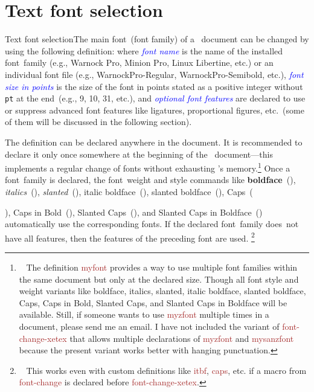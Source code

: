 {\section{Text font selection}{Text font selection}The main font~(font family) of a \capsxetex\ document can be changed by using the following definition:
\ms
\ii{}
\sk
\ii where \textcolor{blue}{\sl font name} is the name of the installed font~family (e.g., Warnock Pro, Minion Pro, Linux Libertine, etc.) or an individual font file (e.g., WarnockPro-Regular, WarnockPro-Semibold, etc.), \textcolor{blue}{\sl font size in points} is the size of the font in points stated as a positive integer without {\tt pt} at the end~(e.g., 9, 10, 31, etc.), and \textcolor{blue}{\sl optional font features} are declared to use or suppress advanced font features like ligatures, proportional figures, etc.~(some of them will be discussed in the following section).


The definition  can be declared anywhere in the document. It is recommended to declare it only once somewhere at the beginning of the \capstex\ document---this implements a regular change of fonts without exhausting \capstex's memory.\footnote{\ \; The definition \textcolor{brown}{\eighttt \bsl myfont} provides a way to use multiple font families within the same document but only at the declared size. Though all font style and weight variants like {\eightbf boldface}, {\eightit italics}, {\eightsl slanted}, {\eightitbf italic boldface}, {\eightslbf slanted boldface}, {\eightcaps Caps}, {\eightcapsbf Caps in Bold}, {\eightcapssl Slanted Caps}, and {\eightcapsslbf Slanted Caps in Boldface} will be available. Still, if someone wants to use \textcolor{brown}{\eighttt \bsl myzfont} multiple times in a document, please send me an email. I have not included the variant of \textcolor{brown}{\eighttt font-change-xetex} that allows multiple declarations of \textcolor{brown}{\eighttt \bsl myzfont} and \textcolor{brown}{\eighttt \bsl mysanzfont} because the present variant works better with hanging punctuation.} Once a font~family is declared, the font~weight and style commands like {\bf boldface}~(), {\it italics}~(), {\sl slanted}~(), {\itbf italic boldface}~(), {\slbf slanted boldface}~(), {\caps Caps}~({), {\capsbf Caps in Bold}~(), {\capssl Slanted Caps}~(), and {\capsslbf Slanted Caps in Boldface}~() automatically use the corresponding fonts. If the declared font~family does~not have all features, then the features of the preceding font are used. \footnote{\ \; This works even with custom definitions like \textcolor{brown}{\eighttt \bsl itbf}, \textcolor{brown}{\eighttt \bsl caps}, etc. if a macro from \textcolor{brown}{\eighttt font-change} is declared before \textcolor{brown}{\eighttt font-change-xetex}.}

}}
